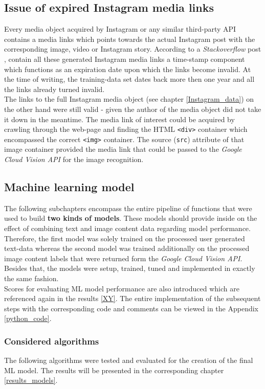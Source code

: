 \subsection{Issue of expired Instagram media links} \label{expired_media_links}
Every media object acquired by Instagram or any similar third-party API contains a media links which points towards the actual Instagram post with the corresponding image, video or Instagram story. According to a \textit{Stackoverflow} post \parencite{Wayne2018}, contain all these generated Instagram media links a time-stamp component which functions as an expiration date upon which the links become invalid. At the time of writing, the training-data set dates back more then one year and all the links already turned invalid.\\
\newline
The links to the full Instagram media object (see chapter \ref{Instagram_data}) on the other hand were still valid - given the author of the media object did not take it down in the meantime. The media link of interest could be acquired by crawling through the web-page and finding the HTML \texttt{<div>} container which encompassed the correct \texttt{<img>} container. The source (\texttt{src}) attribute of that image container provided the media link that could be passed to the \textit{Google Cloud Vision API} for the image recognition.

\subsection{Machine learning model} \label{ml_model}
The following subchapters encompass the entire pipeline of functions that were used to build \textbf{two kinds of models}. These models should provide inside on the effect of combining text and image content data regarding model performance. Therefore, the first model was solely trained on the processed user generated text-data whereas the second model was trained additionally on the processed image content labels that were returned form the \textit{Google Cloud Vision API}. Besides that, the models were setup, trained, tuned and implemented in exactly the same fashion.\\
Scores for evaluating ML model performance are also introduced which are referenced again in the results \ref{XY}. The entire implementation of the subsequent steps with the corresponding code and comments can be viewed in the Appendix \ref{python_code}.

\subsubsection{Considered algorithms} \label{ml_algorithms}
The following algorithms were tested and evaluated for the creation of the final ML model. The results will be presented in the corresponding chapter \ref{results_models}.

